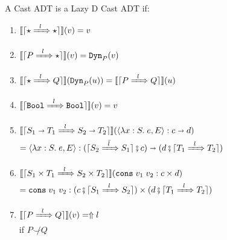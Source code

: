 \documentclass[runningheads]{llncs}
\newcommand{\error}[1]{\ensuremath{\Uparrow#1}}
\newcommand{\Tdyn}[0]{\ensuremath{\star}}
\newcommand{\Pbool}[0]{\ensuremath{\mathtt{Bool}}}
\newcommand{\Pfunc}[2]{\ensuremath{#1 \shortrightarrow #2}}
\newcommand{\Pprod}[2]{\ensuremath{#1 \times #2}}
\newcommand{\elam}[3]{\lambda#1:#2.\;#3}
\newcommand{\econs}[2]{\mathtt{cons} \; #1 \; #2}
\newcommand{\ecast}[2]{\ensuremath{#1 : #2}}
\newcommand{\ccast}[3]{#1 \xRightarrow[]{\enskip #2 \enskip} #3}
\newcommand{\vdyn}[2]{\mathtt{Dyn}_{#1}(#2)}
\newcommand{\vfunc}[4]{\langle\elam{#1}{#2}{#3},#4\rangle}
\newcommand{\vcons}[2]{\econs{#1}{#2}}
\newcommand{\denote}[1]{\ensuremath{\llbracket #1 \rrbracket}}
\newcommand{\compose}[2]{\ensuremath{#1 \fatsemi #2}}
\newcommand{\translate}[1]{\ensuremath{\lceil#1\rceil}}
\newcommand{\notshallowlyconsistent}[2]{\ensuremath{#1\not\smile#2}}
\begin{document}
\begin{definition}
	\label{def:LazyD-CastADT}
	A Cast ADT is a Lazy D Cast ADT if:
	\begin{enumerate}
		\item $\denote{\translate{\ccast{\Tdyn}{l}{\Tdyn}}}(v) = v$
		\item $\denote{\translate{\ccast{P}{l}{\Tdyn}}}(v) = \vdyn{P}{v}$
		\item $\denote{\translate{\ccast{\Tdyn}{l}{Q}}}(\vdyn{P}{u}) = 
		\denote{\translate{\ccast{P}{l}{Q}}}(u)$
		\item $\denote{\translate{\ccast{\Pbool}{l}{\Pbool}}}(v) = v$
		\item 
		$\denote{\translate{\ccast{\Pfunc{S_1}{T_1}}{l}{\Pfunc{S_2}{T_2}}}}(
			\ecast{\vfunc{x}{S}{e}{E}}{\Pfunc{c}{d}})$\\
		$=
		\ecast{\vfunc{x}{S}{e}{E}}{
			\Pfunc{
				(\compose{\translate{\ccast{S_2}{\bar{l}}{S_1}}}{c})}{
				(\compose{d}{\translate{\ccast{T_1}{l}{T_2}}})}}$
		\item 
		$\denote{\translate{\ccast{\Pprod{S_1}{T_1}}{l}{\Pprod{S_2}{T_2}}}}(
		\ecast{\vcons{v_1}{v_2}}{\Pprod{c}{d}})$\\
		$=
		\ecast{\vcons{v_1}{v_2}}{
			\Pprod{
				(\compose{c}{\translate{\ccast{S_1}{l}{S_2}}})}{
				(\compose{d}{\translate{\ccast{T_1}{l}{T_2}}})}}$
		\item $\denote{\translate{\ccast{P}{l}{Q}}}(v) = \error{l}$\\
			if $\notshallowlyconsistent{P}{Q}$
	\end{enumerate}
\end{definition}
\end{document}
